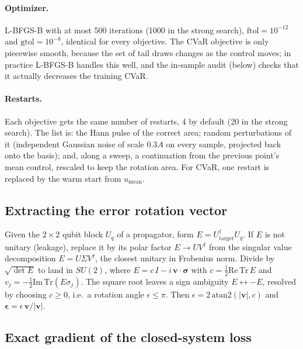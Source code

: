 \documentclass[aps,pra,onecolumn,notitlepage,superscriptaddress,nofootinbib,floatfix]{revtex4-2}
\newcommand{\umean}{u_{\mathrm{mean}}}
\begin{document}
\paragraph*{Optimizer.} L-BFGS-B \cite{Byrd1995} with at most 500 iterations
(1000 in the strong search), $\mathrm{ftol}=10^{-12}$ and
$\mathrm{gtol}=10^{-8}$, identical for every objective. The CVaR objective is
only piecewise smooth, because the set of tail draws changes as the control
moves; in practice L-BFGS-B handles this well, and the in-sample audit
(below) checks that it actually decreases the training CVaR.

\paragraph*{Restarts.} Each objective gets the same number of restarts, 4 by
default (20 in the strong search). The list is: the Hann pulse of the correct
area; random perturbations of it (independent Gaussian noise of scale $0.3A$
on every sample, projected back onto the basis); and, along a sweep, a
continuation from the previous point's mean control, rescaled to keep the
rotation area. For CVaR, one restart is replaced by the warm start from
$\umean$.


\subsection{Extracting the error rotation vector}

Given the $2\times2$ qubit block $U_q$ of a propagator, form
$E=U_{\mathrm{target}}^\dagger U_q$. If $E$ is not unitary (leakage), replace
it by its polar factor $E\to U\!V^\dagger$ from the singular value
decomposition $E=U\Sigma V^\dagger$, the closest unitary in Frobenius norm.
Divide by $\sqrt{\det E}$ to land in $SU(2)$, where
$E=c\,I-i\,\mathbf v\cdot\boldsymbol\sigma$ with
$c=\tfrac12\mathrm{Re}\,\mathrm{Tr}\,E$ and
$v_j=-\tfrac12\mathrm{Im}\,\mathrm{Tr}(E\sigma_j)$. The square root leaves a
sign ambiguity $E\leftrightarrow-E$, resolved by choosing $c\ge0$, i.e.\ a
rotation angle $\epsilon\le\pi$. Then $\epsilon=2\,\mathrm{atan2}(|\mathbf v|,c)$
and $\boldsymbol\epsilon=\epsilon\,\mathbf v/|\mathbf v|$.

\subsection{Exact gradient of the closed-system loss}
\end{document}
